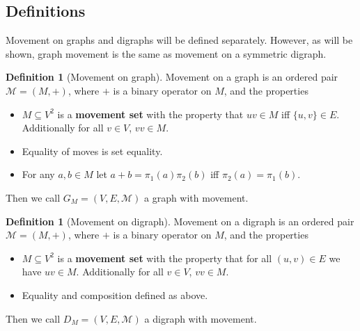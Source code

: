 \documentclass[a4paper,11pt]{article}
\theoremstyle{plain}
\theoremstyle{definition}
\newtheorem{definition}[theorem]{Definition}
\begin{document}
\subsection{Definitions}
Movement on graphs and digraphs will be defined separately. However,
as will be shown, graph movement is the same as movement on a symmetric
digraph.
\begin{definition}[Movement on graph]\label{def graph movement}
	Movement on a graph is an ordered pair $\mathcal{M} = (M,+)$,
	where $+$ is a binary operator on $M$, and the properties
	\begin{itemize}
		\item $M \subseteq V^2$ is a \textbf{movement set} with the 
			property that $uv \in M$ iff $\{u,v\} \in E$. Additionally 
			for all $v \in V$, $vv\in M$.
		\item Equality of moves is set equality.
		\item For any $a,b\in M$ let $a+b = \pi_1(a)\pi_2(b)$ iff
			$\pi_2(a) = \pi_1(b)$.
	\end{itemize}
	Then we call $G_M=(V,E,\mathcal{M})$ a graph with movement.
\end{definition}
\begin{definition}[Movement on digraph]\label{def digraph movement}
	Movement on a digraph is an ordered pair $\mathcal{M} = (M,+)$,
	where $+$ is a binary operator on $M$, and the properties
	\begin{itemize}
		\item $M \subseteq V^2$ is a \textbf{movement set} with the 
			property that for all $(u,v) \in E$ we have $uv
			\in M$. Additionally for all $v \in V$, $vv\in M$.
		\item Equality and composition defined as above.
	\end{itemize}
	Then we call $D_M=(V,E,\mathcal{M})$ a digraph with movement.
\end{definition}
\end{document}
